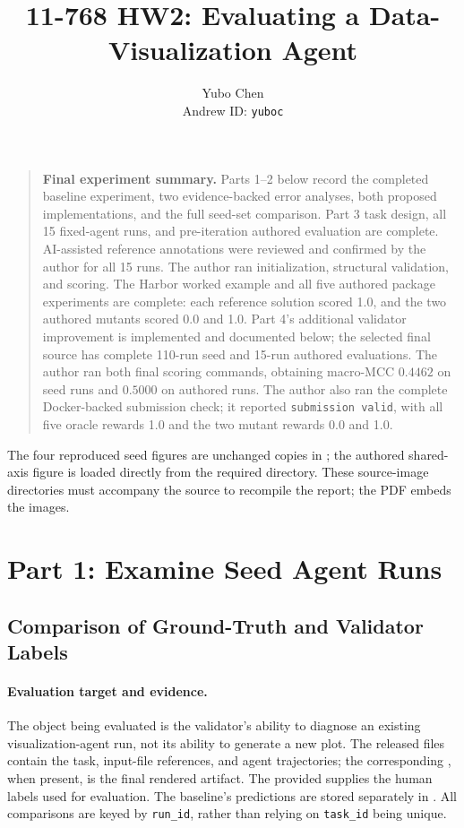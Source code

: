 \documentclass[11pt]{article}
\title{11-768 HW2: Evaluating a Data-Visualization Agent}
\author{Yubo Chen\\Andrew ID: \texttt{yuboc}}
\date{}
\begin{document}
\maketitle

\begin{quote}
\small
\textbf{Final experiment summary.}
Parts 1--2 below record the completed baseline experiment, two evidence-backed
error analyses, both proposed implementations, and the full seed-set comparison.
Part 3 task design, all 15 fixed-agent runs, and pre-iteration authored
evaluation are complete. AI-assisted reference annotations were reviewed
and confirmed by the author for all 15 runs. The author ran initialization,
structural validation, and scoring.
The Harbor worked example and all five authored package experiments are
complete: each reference solution scored 1.0, and the two authored mutants
scored 0.0 and 1.0.
Part 4's additional validator improvement is implemented and documented below;
the selected final source has complete 110-run seed and 15-run authored
evaluations. The author ran both final scoring commands, obtaining
macro-MCC $0.4462$ on seed runs and $0.5000$ on authored runs.
The author also ran the complete Docker-backed submission check; it
reported \texttt{submission valid}, with all five oracle rewards 1.0
and the two mutant rewards 0.0 and 1.0.
\end{quote}

The four reproduced seed figures are unchanged copies in
; the authored shared-axis figure is loaded directly
from the required  directory. These source-image directories
must accompany the source to recompile the report; the PDF embeds the images.

\section{Part 1: Examine Seed Agent Runs}

\subsection{Comparison of Ground-Truth and Validator Labels}
\label{sec:baseline}

\paragraph{Evaluation target and evidence.}
The object being evaluated is the validator's ability to diagnose an existing
visualization-agent run, not its ability to generate a new plot.
The released  files contain the task,
input-file references, and agent trajectories; the corresponding
, when present, is the final rendered artifact.
The provided  supplies the human labels used for
evaluation. The baseline's predictions are stored separately in
. All comparisons are keyed by
\texttt{run\_id}, rather than relying on \texttt{task\_id} being unique.
\end{document}
